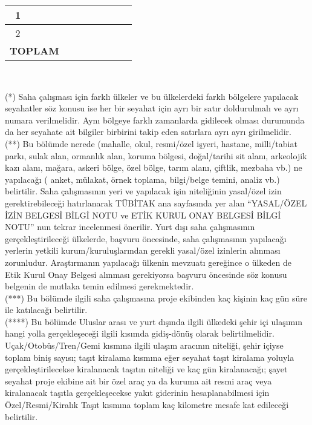 \begin{center}
\begin{tabular}{|c|c|c|c|c|c|c|c|c|c|}
1 &  &  &  &  &  &  &  &  &  \\ \hline
2 &  &  &  &  &  &  &  &  &  \\ \hline
\multicolumn{3}{|l|}{\textbf{TOPLAM}} &  &  &  &  &  &  &  \\ \hline
\end{tabular}\\%
\end{center}
{\footnotesize
\noindent (*) Saha çalışması için farklı ülkeler ve bu ülkelerdeki farklı bölgelere yapılacak seyahatler söz konusu ise her bir seyahat için ayrı bir satır doldurulmalı ve ayrı numara verilmelidir. Aynı bölgeye farklı zamanlarda gidilecek olması durumunda da her seyahate ait bilgiler birbirini takip eden satırlara ayrı ayrı girilmelidir.\\ 
\noindent (**) Bu bölümde nerede (mahalle, okul, resmi/özel işyeri, hastane, milli/tabiat parkı, sulak alan, ormanlık alan, koruma bölgesi, doğal/tarihi sit alanı, arkeolojik kazı alanı, mağara, askeri bölge, özel bölge, tarım alanı, çiftlik, mezbaha vb.) ne yapılacağı ( anket, mülakat, örnek toplama, bilgi/belge temini, analiz vb.) belirtilir. Saha çalışmasının yeri ve yapılacak işin niteliğinin yasal/özel izin gerektirebileceği hatırlanarak TÜBİTAK ana sayfasında yer alan ``YASAL/ÖZEL İZİN BELGESİ BİLGİ NOTU ve ETİK KURUL ONAY BELGESİ BİLGİ NOTU'' nun tekrar incelenmesi önerilir. 
Yurt dışı saha çalışmasının gerçekleştirileceği ülkelerde, başvuru öncesinde, saha çalışmasının yapılacağı yerlerin yetkili kurum/kuruluşlarından gerekli yasal/özel izinlerin alınması zorunludur. Araştırmanın yapılacağı ülkenin mevzuatı gereğince o ülkeden de Etik Kurul Onay Belgesi alınması gerekiyorsa başvuru öncesinde söz konusu belgenin de mutlaka temin edilmesi gerekmektedir.\\
\noindent (***) Bu bölümde ilgili saha çalışmasına proje ekibinden kaç kişinin kaç gün süre ile katılacağı belirtilir. \\
\noindent (****) Bu bölümde Uluslar arası ve yurt dışında ilgili ülkedeki şehir içi ulaşımın hangi yolla gerçekleşeceği ilgili kısımda gidiş-dönüş olarak belirtilmelidir. Uçak/Otobüs/Tren/Gemi kısmına ilgili ulaşım aracının niteliği, şehir içiyse toplam biniş sayısı; taşıt kiralama kısmına eğer seyahat taşıt kiralama yoluyla gerçekleştirilecekse kiralanacak taşıtın niteliği ve kaç gün kiralanacağı; şayet seyahat proje ekibine ait bir özel araç ya da kuruma ait resmi araç veya kiralanacak taşıtla gerçekleşecekse yakıt giderinin hesaplanabilmesi için Özel/Resmi/Kiralık Taşıt kısmına toplam kaç kilometre mesafe kat edileceği belirtilir. 
}

